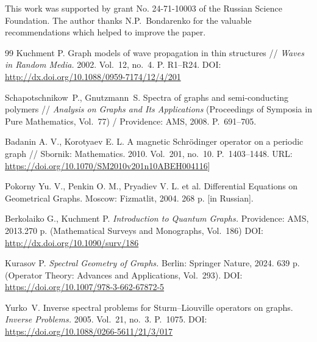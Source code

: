 \documentclass[a4paper, 12pt] {article}
\theoremstyle{plain}
\theoremstyle{remark}
\theoremstyle{plain}
\theoremstyle{definition}
\numberwithin{equation}{section}
\begin{document}
 This work was supported by grant No. 24-71-10003 of the Russian Science Foundation. The author thanks N.P.~Bondarenko for the valuable recommendations which helped to improve the paper.

\begin{thebibliography}{99}
 Kuchment P. Graph models of wave propagation in thin structures // {\it Waves in Random Media.} 2002.
Vol.~12, no.~4.  P. R1--R24. DOI:
\url{http://dx.doi.org/10.1088/0959-7174/12/4/201}

Schapotschnikow~P., Gnutzmann~S. Spectra of graphs and semi-conducting
polymers // {\it Analysis on Graphs and Its Applications} (Proceedings of Symposia in Pure Mathematics, Vol.~77) / Providence: AMS, 2008. P.~691--705.



Badanin A. V., Korotyaev E. L. A magnetic Schr\"{o}dinger operator on a periodic graph // Sbornik: Mathematics. 2010. Vol.~201, no.~10. P.~1403--1448. URL: \url{https://doi.org/10.1070/SM2010v201n10ABEH004116}]



 Pokorny Yu. V., Penkin O. M., Pryadiev V. L. et al. Differential Equations on Geometrical Graphs. Moscow: Fizmatlit, 2004. 268 p. [in Russian].

Berkolaiko G., Kuchment P. {\it Introduction to Quantum Graphs.} Providence: AMS, 2013.270 p. (Mathematical Surveys and Monographs,  Vol.~186) DOI: \url{http://dx.doi.org/10.1090/surv/186}

 Kurasov P. {\it Spectral Geometry of Graphs.} Berlin: Springer Nature, 2024. 639 p. (Operator Theory: Advances and Applications, Vol.~293). 
DOI: \url{https://doi.org/10.1007/978-3-662-67872-5}

  Yurko~V. Inverse spectral problems for Sturm--Liouville operators on graphs. {\it 
 Inverse Problems.} 2005. Vol.~21, no.~3. P.~1075.
DOI:  \url{https://doi.org/10.1088/0266-5611/21/3/017}


\end{thebibliography}
\end{document}
